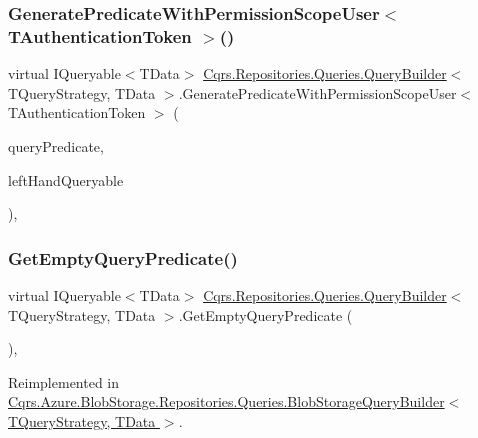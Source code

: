 \subsubsection{\texorpdfstring{Generate\+Predicate\+With\+Permission\+Scope\+User$<$ T\+Authentication\+Token $>$()}{GeneratePredicateWithPermissionScopeUser< TAuthenticationToken >()}}
{\footnotesize\ttfamily virtual I\+Queryable$<$T\+Data$>$ \hyperlink{classCqrs_1_1Repositories_1_1Queries_1_1QueryBuilder}{Cqrs.\+Repositories.\+Queries.\+Query\+Builder}$<$ T\+Query\+Strategy, T\+Data $>$.Generate\+Predicate\+With\+Permission\+Scope\+User$<$ T\+Authentication\+Token $>$ (\begin{DoxyParamCaption}\item[{\hyperlink{classCqrs_1_1Repositories_1_1Queries_1_1QueryPredicate}{Query\+Predicate}}]{query\+Predicate,  }\item[{I\+Queryable$<$ T\+Data $>$}]{left\+Hand\+Queryable }\end{DoxyParamCaption})\hspace{0.3cm}{\ttfamily [protected]}, {\ttfamily [virtual]}}

\mbox{\label{classCqrs_1_1Repositories_1_1Queries_1_1QueryBuilder_a7dc8f0da3bb4ef54b8cbdda6c50ee0a1}} 
\subsubsection{\texorpdfstring{Get\+Empty\+Query\+Predicate()}{GetEmptyQueryPredicate()}}
{\footnotesize\ttfamily virtual I\+Queryable$<$T\+Data$>$ \hyperlink{classCqrs_1_1Repositories_1_1Queries_1_1QueryBuilder}{Cqrs.\+Repositories.\+Queries.\+Query\+Builder}$<$ T\+Query\+Strategy, T\+Data $>$.Get\+Empty\+Query\+Predicate (\begin{DoxyParamCaption}{ }\end{DoxyParamCaption})\hspace{0.3cm}{\ttfamily [protected]}, {\ttfamily [virtual]}}



Reimplemented in \hyperlink{classCqrs_1_1Azure_1_1BlobStorage_1_1Repositories_1_1Queries_1_1BlobStorageQueryBuilder_a5987844de032c5473714dafcee7f4ae1}{Cqrs.\+Azure.\+Blob\+Storage.\+Repositories.\+Queries.\+Blob\+Storage\+Query\+Builder$<$ T\+Query\+Strategy, T\+Data $>$}.

